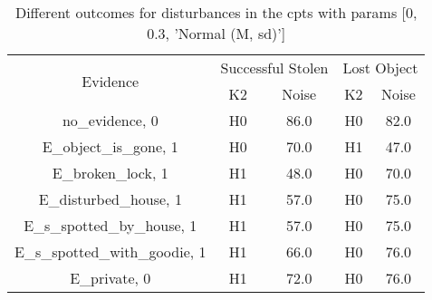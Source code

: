 \begin{table}\begin{tabular}{c|cc|cc}\toprule\multirow{2}{*}{Evidence} & \multicolumn{2}{c}{Successful Stolen} & \multicolumn{2}{c}{Lost Object} \\& {K2} & {Noise} & {K2} & {Noise} \\\midrule
no\_evidence, 0 & \cellcolor{Bittersweet}H0&\cellcolor{Bittersweet}86.0&\cellcolor{Bittersweet}H0&\cellcolor{Bittersweet}82.0\\E\_object\_is\_gone, 1 & \cellcolor{Bittersweet}H0&\cellcolor{Bittersweet}70.0&\cellcolor{Bittersweet}H1&\cellcolor{Bittersweet}47.0\\E\_broken\_lock, 1 & \cellcolor{Bittersweet}H1&\cellcolor{Bittersweet}48.0&\cellcolor{Bittersweet}H0&\cellcolor{Bittersweet}70.0\\E\_disturbed\_house, 1 & \cellcolor{Bittersweet}H1&\cellcolor{Bittersweet}57.0&\cellcolor{Bittersweet}H0&\cellcolor{Bittersweet}75.0\\E\_s\_spotted\_by\_house, 1 & \cellcolor{Bittersweet}H1&\cellcolor{Bittersweet}57.0&\cellcolor{Bittersweet}H0&\cellcolor{Bittersweet}75.0\\E\_s\_spotted\_with\_goodie, 1 & \cellcolor{Bittersweet}H1&\cellcolor{Bittersweet}66.0&\cellcolor{Bittersweet}H0&\cellcolor{Bittersweet}76.0\\E\_private, 0 & \cellcolor{Bittersweet}H1&\cellcolor{Bittersweet}72.0&\cellcolor{Bittersweet}H0&\cellcolor{Bittersweet}76.0\\\bottomrule\end{tabular}\caption{Different outcomes for disturbances in the cpts with params [0, 0.3, 'Normal (M, sd)']}\end{table}